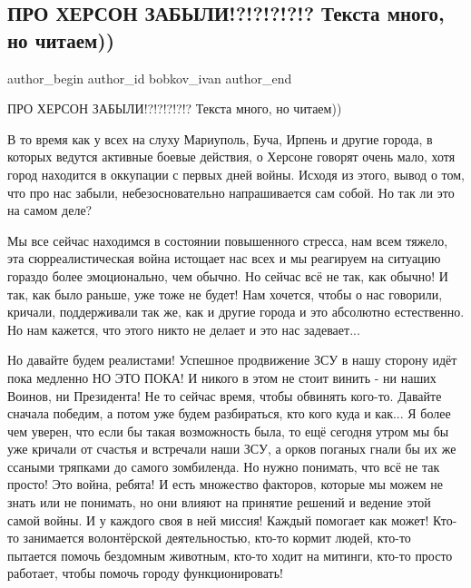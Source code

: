  
 
 
 
 
 
\subsection{ПРО ХЕРСОН ЗАБЫЛИ!?!?!?!?!?  Текста много, но читаем))}
\label{sec:06_05_2022.fb.bobkov_ivan.1.pro_herson_zabyli}
 
\ifcmt
 author_begin
   author_id bobkov_ivan
 author_end
\fi

ПРО ХЕРСОН ЗАБЫЛИ!?!?!?!?!?  Текста много, но читаем)) 

В то время как у всех на слуху Мариуполь, Буча, Ирпень и другие города, в
которых ведутся активные боевые действия, о Херсоне говорят очень мало, хотя
город находится в оккупации с первых дней войны. Исходя из этого, вывод о том,
что про нас забыли, небезосновательно напрашивается сам собой. Но так ли это на
самом деле?


Мы все сейчас находимся в состоянии повышенного стресса, нам всем тяжело, эта
сюрреалистическая война истощает нас всех и мы реагируем на ситуацию гораздо
более эмоционально, чем обычно. Но сейчас всё не так, как обычно! И так, как
было раньше, уже тоже не будет! Нам хочется, чтобы о нас говорили, кричали,
поддерживали так же, как и другие города и это абсолютно естественно. Но нам
кажется, что этого никто не делает и это нас задевает...

Но давайте будем реалистами! Успешное продвижение ЗСУ в нашу сторону идёт пока
медленно НО ЭТО ПОКА! И никого в этом не стоит винить - ни наших Воинов, ни
Президента! Не то сейчас время, чтобы обвинять кого-то. Давайте сначала
победим, а потом уже будем разбираться, кто кого куда и как... Я более чем
уверен, что если бы такая возможность была, то ещё сегодня утром мы бы уже
кричали от счастья и встречали наши ЗСУ, а орков поганых гнали бы их же ссаными
тряпками до самого зомбиленда. Но нужно понимать, что всё не так просто! Это
война, ребята! И есть множество факторов, которые мы можем не знать или не
понимать, но они влияют на принятие решений и ведение этой самой войны. И у
каждого своя в ней миссия! Каждый помогает как может! Кто-то занимается
волонтёрской деятельностью, кто-то кормит людей, кто-то пытается помочь
бездомным животным, кто-то ходит на митинги, кто-то просто работает, чтобы
помочь городу функционировать! 

